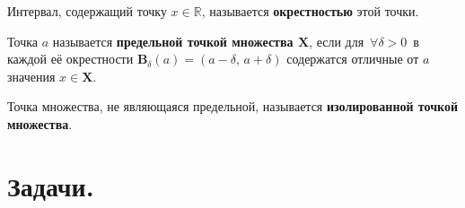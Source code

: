 \documentclass[10pt]{article}
\begin{document}
\begin{definition}
Интервал, содержащий точку $x\in \mathbb{R}$, называется \textbf{окрестностью} этой точки.
\end{definition}

\begin{definition}
Точка $a$ называется \textbf{предельной точкой множества $\textbf{X}$}, если для $\, \forall \delta > 0 \,$ в каждой её окрестности $\textbf{B}_\delta(a)=(a-\delta,\,a+\delta)$ содержатся отличные от $a$ значения $x\in\textbf{X}.$
\end{definition}

\begin{definition}
Точка множества, не являющаяся предельной, называется \textbf{изолированной точкой множества}.
\end{definition}

\section[Задачи]{Задачи.}\label{sec:problems_9}
\end{document}
